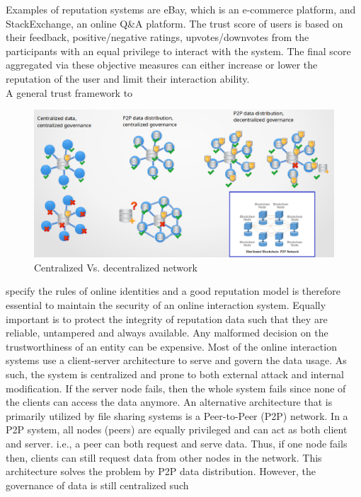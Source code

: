 Examples of reputation systems are eBay, which is an e-commerce platform, and
StackExchange, an online Q\&A platform. The trust score of users is based on
their feedback, positive/negative ratings, upvotes/downvotes from the
participants with an equal privilege to interact with the system. The final
score aggregated via these objective measures can either increase or lower the
reputation of the user and limit their interaction ability.\\
A general trust framework to
\begin{figure}
	\begin{center}
		\includegraphics[width=1.0\textwidth]{Images/WhyBlockchain.eps}
		\caption{Centralized Vs. decentralized network}
		\label{fig:WhyBlockchain}
	\end{center}
\end{figure}
specify the rules of online identities and a good
reputation model is therefore essential to maintain the security of an online
interaction system. Equally important is to protect the integrity of reputation
data such that they are reliable, untampered and always available. Any
malformed decision on the trustworthiness of an entity can be expensive. Most
of the online interaction systems use a client-server architecture to serve and
govern the data usage. As such, the system is centralized and prone to both
external attack and internal modification. If the server node fails, then the
whole system fails since none of the clients can access the data anymore. An
alternative architecture that is primarily utilized by file sharing systems is
a Peer-to-Peer (P2P) network. In a P2P system, all nodes (peers) are equally
privileged and can act as both client and server. i.e., a peer can both request
and serve data. Thus, if one node fails then, clients can still request data
from other nodes in the network. This architecture solves the problem by P2P
data distribution. However, the governance of data is still centralized such
